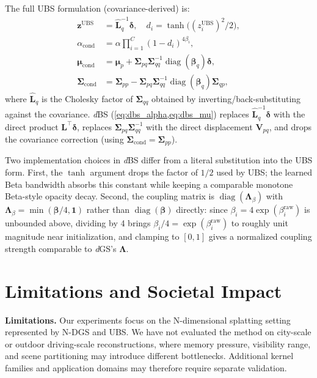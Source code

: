 \documentclass{article}
\newcommand{\dgs}{\textit{d}GS\xspace}
\newcommand{\dbs}{\textit{d}BS\xspace}
\theoremstyle{plain}
\theoremstyle{definition}
\theoremstyle{remark}
\begin{document}
The full UBS formulation (covariance-derived) is:
\begin{align}
\mathbf{z}^{\text{UBS}} &= \hat{\mathbf{L}}_q^{-1} \boldsymbol{\delta}, \quad d_i = \tanh\!\bigl((z_i^{\text{UBS}})^2/2\bigr), \\
\alpha_{\text{cond}} &= \alpha \prod_{i=1}^{C} (1 - d_i)^{4\beta_i}, \\
\boldsymbol{\mu}_{\text{cond}} &= \boldsymbol{\mu}_p + \boldsymbol{\Sigma}_{pq} \boldsymbol{\Sigma}_{qq}^{-1} \operatorname{diag}(\boldsymbol{\beta}_q) \boldsymbol{\delta}, \\
\boldsymbol{\Sigma}_{\text{cond}} &= \boldsymbol{\Sigma}_{pp} - \boldsymbol{\Sigma}_{pq} \boldsymbol{\Sigma}_{qq}^{-1} \operatorname{diag}(\boldsymbol{\beta}_q) \boldsymbol{\Sigma}_{qp},
\end{align}
where $\hat{\mathbf{L}}_q$ is the Cholesky factor of $\boldsymbol{\Sigma}_{qq}$ obtained by inverting/back-substituting against the covariance. \dbs{} (\cref{eq:dbs_alpha,eq:dbs_mu}) replaces $\hat{\mathbf{L}}_q^{-1}\boldsymbol{\delta}$ with the direct product $\mathbf{L}^\top\boldsymbol{\delta}$, replaces $\boldsymbol{\Sigma}_{pq}\boldsymbol{\Sigma}_{qq}^{-1}$ with the direct displacement $\mathbf{V}_{pq}$, and drops the covariance correction (using $\boldsymbol{\Sigma}_{\text{cond}}=\boldsymbol{\Sigma}_{pp}$).

Two implementation choices in \dbs{} differ from a literal substitution into the UBS form. First, the $\tanh$ argument drops the factor of $1/2$ used by UBS; the learned Beta bandwidth absorbs this constant while keeping a comparable monotone Beta-style opacity decay. Second, the coupling matrix is $\operatorname{diag}(\boldsymbol{\Lambda}_\beta)$ with $\boldsymbol{\Lambda}_\beta = \min(\boldsymbol{\beta}/4,\mathbf{1})$ rather than $\operatorname{diag}(\boldsymbol{\beta})$ directly: since $\beta_i = 4\exp(\beta_i^{\text{raw}})$ is unbounded above, dividing by 4 brings $\beta_i/4 = \exp(\beta_i^{\text{raw}})$ to roughly unit magnitude near initialization, and clamping to $[0,1]$ gives a normalized coupling strength comparable to \dgs{}'s $\boldsymbol{\Lambda}$.

\section{Limitations and Societal Impact}
\label{sec:limitations}

\textbf{Limitations.}
Our experiments focus on the N-dimensional splatting setting represented by N-DGS and UBS. We have not evaluated the method on city-scale or outdoor driving-scale reconstructions, where memory pressure, visibility range, and scene partitioning may introduce different bottlenecks. Additional kernel families and application domains may therefore require separate validation.
\end{document}
